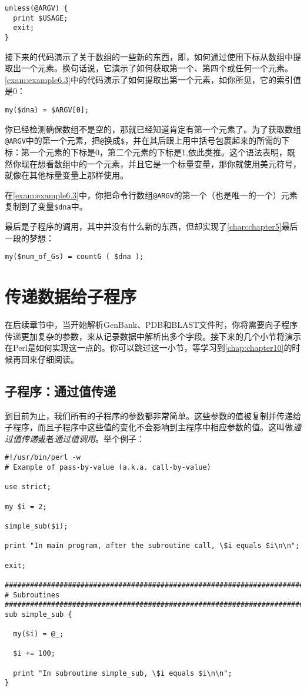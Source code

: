 \begin{lstlisting}
unless(@ARGV) {
  print $USAGE;
  exit;
}
\end{lstlisting}

接下来的代码演示了关于数组的一些新的东西，即，如何通过使用下标从数组中提取出一个元素。换句话说，它演示了如何获取第一个、第四个或任何一个元素。\autoref{exam:example6.3}中的代码演示了如何提取出第一个元素，如你所见，它的索引值是0：

\begin{lstlisting}
my($dna) = $ARGV[0];
\end{lstlisting}

你已经检测确保数组不是空的，那就已经知道肯定有第一个元素了。为了获取数组\verb|@ARGV|中的第一个元素，把\verb|@|换成\verb|$|，并在其后跟上用中括号包裹起来的所需的下标：第一个元素的下标是0，第二个元素的下标是1,依此类推。这个语法表明，既然你现在想看数组中的一个元素，并且它是一个标量变量，那你就使用美元符号，就像在其他标量变量上那样使用。

在\autoref{exam:example6.3}中，你把命令行数组\verb|@ARGV|的第一个（也是唯一的一个）元素复制到了变量\verb|$dna|中。

最后是子程序的调用，其中并没有什么新的东西，但却实现了\autoref{chap:chapter5}最后一段的梦想：

\begin{lstlisting}
my($num_of_Gs) = countG ( $dna );
\end{lstlisting}

\section{传递数据给子程序}
在后续章节中，当开始解析GenBank、PDB和BLAST文件时，你将需要向子程序传递更加复杂的参数，来从记录数据中解析出多个字段。接下来的几个小节将演示在Perl是如何实现这一点的。你可以跳过这一小节，等学习到\autoref{chap:chapter10}的时候再回来仔细阅读。

\subsection{子程序：通过值传递}
到目前为止，我们所有的子程序的参数都非常简单。这些参数的值被复制并传递给子程序，而且子程序中这些值的变化不会影响到主程序中相应参数的值。这叫做\textit{通过值传递}或者\textit{通过值调用}。举个例子：

\begin{lstlisting}
#!/usr/bin/perl -w
# Example of pass-by-value (a.k.a. call-by-value)

use strict;

my $i = 2;

simple_sub($i);

print "In main program, after the subroutine call, \$i equals $i\n\n";

exit;

################################################################################
# Subroutines
################################################################################
sub simple_sub {

  my($i) = @_;

  $i += 100;

  print "In subroutine simple_sub, \$i equals $i\n\n";
}
\end{lstlisting}

